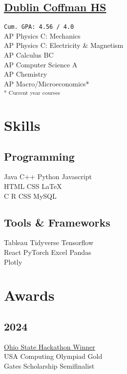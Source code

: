 \documentclass[]{deedy-resume-openfont}
\begin{document}
\begin{minipage}[t]{0.25\textwidth}
\subsection{\href{https://www.dublinschools.net/Coffman}{Dublin Coffman HS}}
\texttt{Cum. GPA: 4.56 / 4.0} \\ 
AP Physics C: Mechanics \\
AP Physics C: Electricity \& Magnetism \\
AP Calculus BC \\
AP Computer Science A\\
AP Chemistry\\
AP Macro/Microeconomics*\\
\textsubscript{* Current year courses}


\section{Skills}
\subsection{Programming}
Java \textbullet{}   C++ \textbullet{} Python \textbullet{} Javascript \\
HTML \textbullet{} CSS \textbullet \LaTeX \\ 
C \textbullet{} R \textbullet{} CSS \textbullet{} \textbullet{} MySQL \\
\vspace{1em}
\subsection{Tools \& Frameworks}
Tableau \textbullet{} Tidyverse \textbullet{} Tensorflow \\
React \textbullet{} PyTorch \textbullet{} Excel \textbullet{} Pandas\\
Plotly 

\sectionsep


\section{Awards} 
\subsection{2024}
\href{https://hack.osu.edu/hs/fall-2023/}{Ohio State Hackathon Winner} \\
USA Computing Olympiad Gold \\
Gates Scholarship Semifinalist

\end{minipage}
\end{document}
